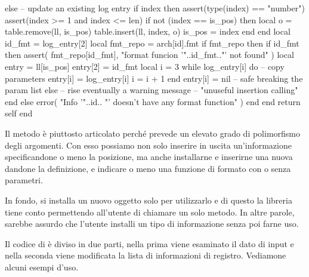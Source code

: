 \begin{lines}
    else -- update an existing log entry
        if index then
            assert(type(index) == "number")
            assert(index >= 1 and index <= len)
            if not (index == is_pos) then
                local o = table.remove(ll, is_pos)
                table.insert(ll, index, o)
                is_pos = index
            end
        end
        local id_fmt = log_entry[2]
        local fmt_repo = arch[id].fmt
        if fmt_repo then
            if id_fmt then
                assert(
                    fmt_repo[id_fmt],
                    "format funcion '"..id_fmt.."' not found"
                )
                local entry = ll[is_pos]
                entry[2] = id_fmt
                local i = 3
                while log_entry[i] do -- copy parameters
                   entry[i] = log_entry[i]
                   i = i + 1
                end
                entry[i] = nil -- safe breaking the param list
            else
                -- rise eventually a warning message
                -- "unuseful insertion calling"
            end
        else
            error(
                "Info '"..id..
                "' doesn't have any format function"
            )
        end
    end
    return self
end
\end{lines}

Il metodo è piuttosto articolato perché prevede un elevato grado di polimorfismo
degli argomenti. Con esso possiamo non solo inserire in uscita un'informazione
specificandone o meno la posizione, ma anche installarne e inserirne una nuova
dandone la definizione, e indicare o meno una funzione di formato con o senza
parametri.

In fondo, si installa un nuovo oggetto  solo per utilizzarlo e di
questo la libreria tiene conto permettendo all'utente di chiamare un solo
metodo. In altre parole, sarebbe assurdo che l'utente installi un tipo di
informazione senza poi farne uso.

Il codice di  è diviso in due parti, nella prima viene
esaminato il dato di input e nella seconda viene modificata la lista di
informazioni di registro. Vediamone alcuni esempi d'uso.

